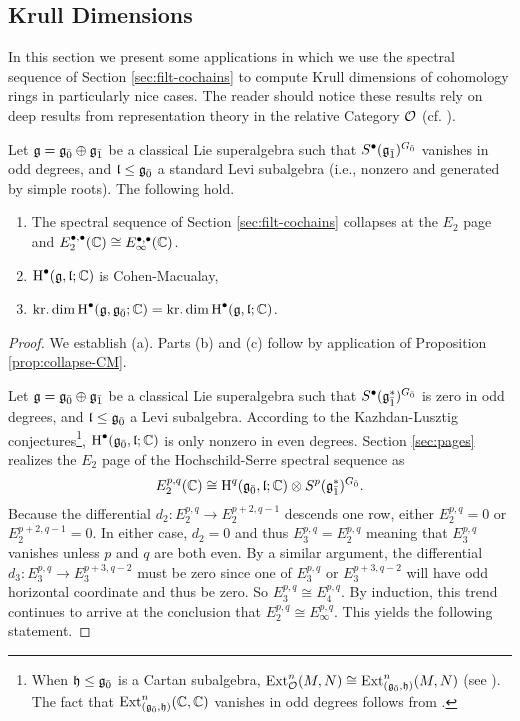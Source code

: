 \subsection{Krull Dimensions}
\label{sec:krull-dims}

In this section we present some applications in which we use the spectral sequence of Section \ref{sec:filt-cochains} to compute Krull dimensions of cohomology rings in particularly nice cases. The reader should notice these results rely on deep results from representation theory in the relative Category $\mathcal{O}$ (cf. \cite[\S 8]{MR2428237}).

\begin{theorem} \label{prop:E2-collapse}
  Let $\mathfrak{g} = {\mathfrak{g}}_{\bar{0}} \oplus {\mathfrak{g}}_{\bar{1}}$ be a classical Lie superalgebra such that $S^\bullet({\mathfrak{g}}_{\bar{1}})^{{G}_{\bar{0}}}$ vanishes in odd degrees, and $\mathfrak{l} \leq {\mathfrak{g}}_{\bar{0}}$ a standard Levi subalgebra (i.e., nonzero and generated by simple roots). The following hold.
  \begin{enumerate}[\indent\rm (a)]
    \item The spectral sequence of Section \ref{sec:filt-cochains} collapses at the $E_2$ page and $E_2^{\bullet,\bullet}(\mathbb{C}) \cong E_\infty^{\bullet,\bullet}(\mathbb{C})$.
    \item $\operatorname{H}^\bullet(\mathfrak{g},\mathfrak{l};\mathbb{C})$ is Cohen-Macualay,
    \item $\operatorname{kr.dim} \operatorname{H}^\bullet(\mathfrak{g},{\mathfrak{g}}_{\bar{0}};\mathbb{C}) = \operatorname{kr.dim} \operatorname{H}^\bullet(\mathfrak{g},\mathfrak{l};\mathbb{C})$.
  \end{enumerate}
\end{theorem}

\begin{proof}
  We establish (a). Parts (b) and (c) follow by application of Proposition \ref{prop:collapse-CM}.

  Let $\mathfrak{g} = {\mathfrak{g}}_{\bar{0}} \oplus {\mathfrak{g}}_{\bar{1}}$ be a classical Lie superalgebra such that $S^\bullet({\mathfrak{g}}_{\bar{1}}^*)^{{G}_{\bar{0}}}$ is zero in odd degrees, and $\mathfrak{l} \leq {\mathfrak{g}}_{\bar{0}}$ a Levi subalgebra. According to the Kazhdan-Lusztig conjectures\footnote{When $\mathfrak{h} \leq {\mathfrak{g}}_{\bar{0}}$ is a Cartan subalgebra, $\operatorname{Ext}^n_{\mathcal{O}}(M,N) \cong \operatorname{Ext}^n_{({\mathfrak{g}}_{\bar{0}},\mathfrak{h})}(M,N)$ (see \cite[Theorem 6.15]{MR2428237}). The fact that $\operatorname{Ext}^n_{({\mathfrak{g}}_{\bar{0}},\mathfrak{h})}(\mathbb{C},\mathbb{C})$ vanishes in odd degrees follows from \cite{MR1245719}.}, $\operatorname{H}^\bullet({\mathfrak{g}}_{\bar{0}},\mathfrak{l};\mathbb{C})$ is only nonzero in even degrees. Section \ref{sec:pages} realizes the $E_2$ page of the Hochschild-Serre spectral sequence as
\[
  E_2^{p,q}(\mathbb{C}) \cong \operatorname{H}^q({\mathfrak{g}}_{\bar{0}},\mathfrak{l};\mathbb{C}) \otimes S^p({\mathfrak{g}}_{\bar{1}}^*)^{{G}_{\bar{0}}}.
\]
Because the differential $d_2:E_2^{p,q} \to E_2^{p+2,q-1}$ descends one row, either $E_2^{p,q} = 0$ or $E_2^{p+2,q-1} = 0$. In either case, $d_2 = 0$ and thus $E_3^{p,q} = E_2^{p,q}$ meaning that $E_3^{p,q}$ vanishes unless $p$ and $q$ are both even. By a similar argument, the differential $d_3:E_3^{p,q} \to E_3^{p+3,q-2}$ must be zero since one of $E_3^{p,q}$ or $E_3^{p+3,q-2}$ will have odd horizontal coordinate and thus be zero. So $E_3^{p,q} \cong E_4^{p,q}$. By induction, this trend continues to arrive at the conclusion that $E_2^{p,q} \cong E_\infty^{p,q}$. This yields the following statement.
\end{proof}

